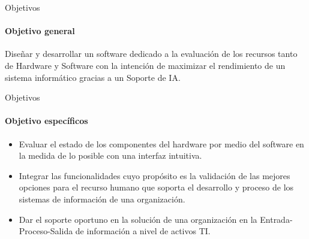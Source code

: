 \begin{frame}{Objetivos}
    \framesubtitle{Objetivo general}
    Diseñar y desarrollar un software dedicado a la evaluación de
    los recursos tanto de Hardware y Software con la intención de
    maximizar el rendimiento de un sistema informático gracias a un
    Soporte de IA.
\end{frame}
\begin{frame}{Objetivos}
    \framesubtitle{Objetivo específicos}
    \begin{itemize}
        \item Evaluar el estado de los componentes del hardware por
        medio del software en la medida de lo posible con una
        interfaz intuitiva. \pause
        \item Integrar las funcionalidades cuyo propósito es la
        validación de las mejores opciones para el recurso humano
        que soporta el desarrollo y proceso de los sistemas de
        información de una organización. \pause
        \item Dar el soporte oportuno en la solución de una
        organización en la Entrada-Proceso-Salida de información a
        nivel de activos TI.
    \end{itemize}
\end{frame}